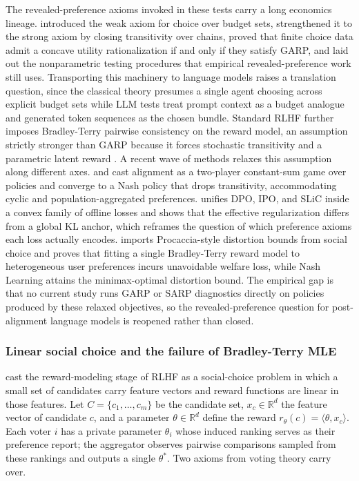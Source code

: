 The revealed-preference axioms invoked in these tests carry a long economics lineage. \citet{samuelson1938consumption} introduced the weak axiom for choice over budget sets, \citet{houthakker1950revealed} strengthened it to the strong axiom by closing transitivity over chains, \citet{afriat1967construction} proved that finite choice data admit a concave utility rationalization if and only if they satisfy GARP, and \citet{varian1982nonparametric} laid out the nonparametric testing procedures that empirical revealed-preference work still uses. Transporting this machinery to language models raises a translation question, since the classical theory presumes a single agent choosing across explicit budget sets while LLM tests treat prompt context as a budget analogue and generated token sequences as the chosen bundle. Standard RLHF further imposes Bradley-Terry pairwise consistency on the reward model, an assumption strictly stronger than GARP because it forces stochastic transitivity and a parametric latent reward \citep{raheja2026unification}. A recent wave of methods relaxes this assumption along different axes. \citet{liu2024comal} and \citet{zhang2025omd} cast alignment as a two-player constant-sum game over policies and converge to a Nash policy that drops transitivity, accommodating cyclic and population-aggregated preferences. \citet{tang2024gpo} unifies DPO, IPO, and SLiC inside a convex family of offline losses and shows that the effective regularization differs from a global KL anchor, which reframes the question of which preference axioms each loss actually encodes. \citet{golz2025distortion} imports Procaccia-style distortion bounds from social choice and proves that fitting a single Bradley-Terry reward model to heterogeneous user preferences incurs unavoidable welfare loss, while Nash Learning attains the minimax-optimal distortion bound. The empirical gap is that no current study runs GARP or SARP diagnostics directly on policies produced by these relaxed objectives, so the revealed-preference question for post-alignment language models is reopened rather than closed.

\subsubsection{Linear social choice and the failure of Bradley-Terry MLE}
\label{sec:linear_social_choice}

\citet{ge2024axioms} cast the reward-modeling stage of RLHF as a social-choice problem in which a small set of candidates carry feature vectors and reward functions are linear in those features. Let $C = \{c_1, \ldots, c_m\}$ be the candidate set, $x_c \in \mathbb{R}^d$ the feature vector of candidate $c$, and a parameter $\theta \in \mathbb{R}^d$ define the reward $r_\theta(c) = \langle \theta, x_c \rangle$. Each voter $i$ has a private parameter $\theta_i$ whose induced ranking serves as their preference report; the aggregator observes pairwise comparisons sampled from these rankings and outputs a single $\theta^*$. Two axioms from voting theory carry over.

